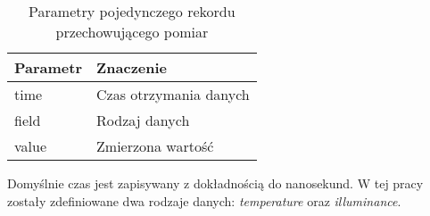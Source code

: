     \begin{xltabular}{1\textwidth} { 
        | >{\raggedright\arraybackslash}X 
        | >{\raggedright\arraybackslash}X | }
        \caption{Parametry pojedynczego rekordu przechowującego pomiar} \label{tab:parametry-pomiaru}\\
        \hline
       Parametr & Znaczenie \\
       \hline
       time & Czas otrzymania danych \\
       \hline
       field & Rodzaj danych \\
       \hline
       value & Zmierzona wartość \\
       \hline
    \end{xltabular}

    Domyślnie czas jest zapisywany z dokładnością do nanosekund. W tej pracy zostały
    zdefiniowane dwa rodzaje danych: \textit{temperature} oraz \textit{illuminance}.